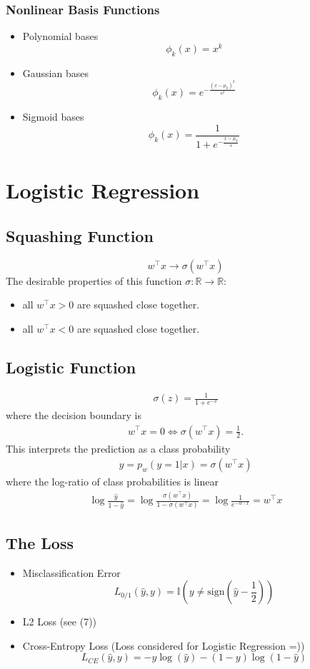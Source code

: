 \documentclass{article}
\begin{document}
\subsubsection{Nonlinear Basis Functions}
\begin{itemize}
    \item Polynomial bases
    \[\phi_k(x) = x^k\]
    \item Gaussian bases
    \[\phi_k(x) = e^{-\frac{(x - \mu_k)^2}{s^2}}\]
    \item Sigmoid bases
    \[\phi_k(x) = \frac{1}{1+e^{-\frac{x - \mu_k}{s}}}\]
\end{itemize}
\section{Logistic Regression}
\subsection{Squashing Function}
\[w^\top x \rightarrow \sigma(w^\top x)\]
The desirable properties of this function $\sigma : \mathbb{R} \rightarrow \mathbb{R}$:
\begin{itemize}
    \item all $w^\top x > 0$ are squashed close together.
    \item all $w^\top x < 0$ are squashed close together.
\end{itemize}
\subsection{Logistic Function}
\begin{align}
    \sigma(z) = \frac{1}{1+e^{-x}}
\end{align}
where the decision boundary is
\begin{align}
    w^\top x = 0 \iff \sigma(w^\top x) = \frac{1}{2}.
\end{align}
This interprets the prediction as a class probability
\begin{align}
    \hat{y} = p_w(y = 1| x) = \sigma(w^\top x)
\end{align}
where the log-ratio of class probabilities is linear
\begin{align}
    \log\frac{\hat{y}}{1-\hat{y}} = \log\frac{\sigma(w^\top x)}{1-\sigma(w^\top x)} = \log\frac{1}{e^{-w\top x}} = w^\top x
\end{align}
\subsection{The Loss}
\begin{itemize}
    \item Misclassification Error
    \[L_{0/1}(\hat{y},y) = \mathbb{I}\left(y\ne \text{sign} \left(\hat{y} - \frac{1}{2}\right)\right)\]
    \item L2 Loss (see (7))
    \item Cross-Entropy Loss (Loss considered for Logistic Regression =))
    \[L_{CE}(\hat{y},y) = -y\log(\hat{y}) - (1-y)\log(1-\hat{y})\]
\end{itemize}
\end{document}
